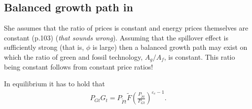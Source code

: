 \subsection{Balanced growth path in \cite{Fried2018ClimateAnalysis}}
She assumes that the ratio of prices is constant and energy prices themselves are constant (p.103) (\textit{that sounds wrong}). Assuming that the spillover effect is sufficiently strong (that is, $\phi$ is large) then a balanced growth path may exist on which the ratio of green and fossil technology, $A_g/A_f$, is constant. This ratio being constant follows from constant price ratios! 

In equilibrium it has to hold that 
\begin{align*}
P_{Gt}G_t= P_{\tilde{F}t}\tilde{F}\left(\frac{P_{\tilde{F}t}}{P_{Gt}}\right)^{\varepsilon_e-1}.
\end{align*} 

